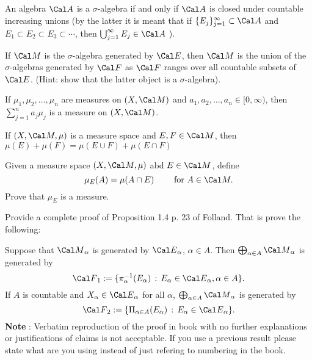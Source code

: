 \endproclaim


 An algebra $\Cal A$ is a $\sigma$-algebra if and only if $\Cal A$ is closed under countable increasing unions
(by the latter it is meant that if $\{E_j\}_{j=1}^{\infty} \subset {\Cal A}$ and 
$E_1 \subset E_2 \subset E_3 \subset \cdots $, then $\bigcup_{j=1}^{\infty} E_j \in {\Cal A} $ ).  


\endproclaim 

  If $ {\Cal M}$ is the $\sigma$-algebra generated by $\Cal E$, then $\Cal M$ is the union of the $\sigma$-algebras generated by $\Cal F$ as $\Cal F$ ranges over all countable subsets of $\Cal E$. (Hint: show that the latter object is a $\sigma$-algebra). 

\endproclaim



 If $\mu_1, \mu_2, \dots, \mu_n$ are measures on $(X, \Cal M)$ and $ a_1, a_2, \dots, a_n \in [0, \infty)$, then $\sum_{j=1}^n a_j \mu_j$ is a measure on $(X, \Cal M)$. 

\endproclaim


 If $(X, \Cal M, \mu)$ is a measure space and $E, F \in \Cal M$, then $ \mu(E) + \mu(F) = \mu(E \cup F) + \mu(E \cap F)$


\endproclaim



 Given a measure space $(X, \Cal M, \mu)$ abd $E \in \Cal M$, define $$\mu_E(A) = \mu (A \cap E) \qquad \text{ for } A \in \Cal M. $$ Prove that $\mu_E$ is a measure. 


\endproclaim


 Provide a complete proof of Proposition 1.4 p. 23 of Folland. That is prove the following:

Suppose that ${\Cal M}_{\alpha}$ is generated by ${\Cal E}_{\alpha}$, $\alpha \in A$. Then $\bigoplus_{\alpha \in A} {\Cal M}_{\alpha}$ is generated by $$\F_1 := \{ \pi^{-1}_{\alpha} (E_{\alpha}) \, : \, E_{\alpha} \in {\Cal E}_{\alpha}, \alpha \in A \}. $$
If $A$ is countable and $X_{\alpha} \in {\Cal E}_{\alpha}$ for all $\alpha$, $\bigoplus_{\alpha \in A} {\Cal M}_{\alpha}$ is generated by 
$$\F_2 := \{ \Pi_{\alpha \in A} (E_{\alpha}) \, : \, E_{\alpha} \in {\Cal E}_{\alpha} \}. $$
\endproclaim 
{\bf Note} : Verbatim reproduction of the proof in book with no further explanations or justifications of claims is  not acceptable. If you use a previous result please state  what are you using instead of just refering to numbering in the book. 

 


\enddocument























